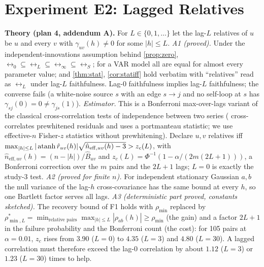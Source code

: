 \section{Experiment E2: Lagged Relatives}
\label{app:e2}

\textbf{Theory (plan 4, addendum A).} For $L\in\{0,1,\dots\}$ let the lag-$L$ relatives of $u$ be $u$ and every $v$ with $\gamma_{uv}(h)\neq0$ for some $|h|\le L$.
\emph{A1 (proved).} Under the independent-innovations assumption behind \cref{prop:zero}, $\rel_0\subseteq\rel_L\subseteq\rel_\infty\subseteq\rel_S$; for a VAR model all are equal for almost every parameter value;
and \cref{thm:stat}, \cref{cor:statiff} hold verbatim with ``relatives'' read as $\rel_L$ under lag-$L$ faithfulness. Lag-0 faithfulness implies lag-$L$ faithfulness; the converse fails
(a white-noise source $s$ with an edge $s\to j$ and no self-loop at $s$ has $\gamma_{sj}(0)=0\ne\gamma_{js}(1)$).
\emph{Estimator.} This is a Bonferroni max-over-lags variant of the classical
cross-correlation tests of independence between two series
(\citealp{haugh1976checking} cross-correlates prewhitened residuals and uses a
portmanteau statistic; we use effective-$n$ Fisher-$z$ statistics without
prewhitening). Declare $u,v$ relatives iff $\max_{|h|\le L}|\operatorname{atanh} \hat r_{uv}(h)|\sqrt{\hat n_{\mathrm{eff},uv}(h)-3}>z_c(L)$, with $\hat n_{\mathrm{eff},uv}(h)=(n-|h|)/\hat B_{uv}$ and
$z_c(L)=\Phi^{-1}(1-\alpha/(2m(2L+1)))$, a Bonferroni correction over the $m$ pairs and the $2L+1$ lags; $L=0$ is exactly the study-3 test.
\emph{A2 (proved for finite $n$).} For independent stationary Gaussian $a,b$ the null variance of the lag-$h$ cross-covariance has the same bound at every $h$, so one Bartlett factor serves all lags.
\emph{A3 (deterministic part proved, constants sketched).} The recovery bound of F1 holds with $\rho_{\min}$ replaced by $\rho^*_{\min,L}=\min_{\text{relative pairs}}\max_{|h|\le L}|\rho_{ab}(h)|\ge\rho_{\min}$ (the gain) and a factor $2L+1$ in the failure probability and the Bonferroni count (the cost):
for 105 pairs at $\alpha=0.01$, $z_c$ rises from $3.90$ ($L=0$) to $4.35$ ($L=3$) and $4.80$ ($L=30$). A lagged correlation must therefore exceed the lag-0 correlation by about $1.12$ ($L=3$) or $1.23$ ($L=30$) times to help.

